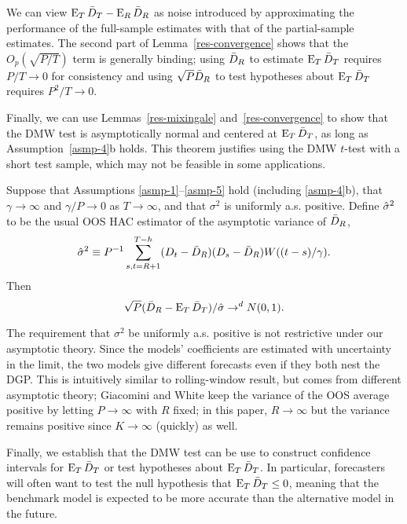 \documentclass[12pt]{article}
\begin{document}
We can view $\operatorname{E}_T \bar{D}_{T} - \operatorname{E}_R \bar{D}_{R}$ as noise introduced by
approximating the performance of the full-sample estimates with that
of the partial-sample estimates. The second part of
Lemma~\ref{res-convergence} shows that the $O_p(\sqrt{P/T})$ term
is generally binding; using $\bar{D}_{R}$ to estimate $\operatorname{E}_T \bar{D}_{T}$ requires
$P/T \to 0$ for consistency and using $\sqrt{P} \bar{D}_{R}$ to test
hypotheses about $\operatorname{E}_T \bar{D}_{T}$ requires $P^2/T \to 0$.

Finally, we can use Lemmas~\ref{res-mixingale}
and~\ref{res-convergence} to show that the DMW test is asymptotically
normal and centered at $\operatorname{E}_T \bar{D}_{T}$, as long as
Assumption~\ref{asmp-4}b holds. This theorem justifies using the DMW
$t$-test with a short test sample, which may not be feasible in some
applications.

\begin{thm}\label{res-oost}
  Suppose that Assumptions \ref{asmp-1}--\ref{asmp-5} hold (including
  \ref{asmp-4}b), that $\gamma \to \infty$ and $\gamma/P \to 0$ as $T
  \to \infty$, and that $\sigma^2$ is uniformly a.s. positive. Define
  $\hat{\sigma}^2$ to be the usual OOS HAC estimator of the asymptotic variance
  of $\bar{D}_{R}$,
  \begin{equation}
    \hat{\sigma}^2 \equiv P^{-1} \sum_{s,t=R+1}^{T-h} (D_t - \bar{D}_{R})(D_s - \bar{D}_{R})
    W((t-s)/\gamma).
  \end{equation}
  Then
  \begin{equation}
    \sqrt{P}(\bar{D}_{R} - \operatorname{E}_T\bar{D}_{T})/\hat{\sigma} \to^d N(0,1).
  \end{equation}
\end{thm}

The requirement that $\sigma^2$ be uniformly a.s. positive is not
restrictive under our asymptotic theory. Since the models'
coefficients are estimated with uncertainty in the limit, the two
models give different forecasts even if they both nest the DGP.  This
is intuitively similar to  rolling-window result, but
comes from different asymptotic theory; Giacomini and White keep the
variance of the OOS average positive by letting $P \to \infty$ with
$R$ fixed; in this paper, $R \to \infty$ but the variance remains
positive since $K \to \infty$ (quickly) as well.

Finally, we establish that the DMW test can be use to construct
confidence intervals for $\operatorname{E}_T \bar{D}_{T}$ or test hypotheses about $\operatorname{E}_T
\bar{D}_{T}$. In particular, forecasters will often want to test the null
hypothesis that $\operatorname{E}_T \bar{D}_{T} \leq 0$, meaning that the benchmark model
is expected to be more accurate than the alternative model in the
future.
\end{document}
